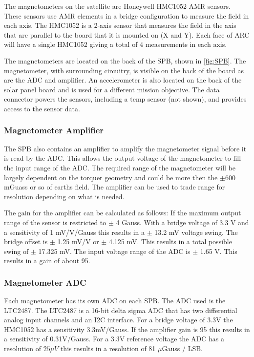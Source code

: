 The magnetometers on the satellite are Honeywell HMC1052 \ac{AMR} sensors. These sensors use \ac{AMR} elements in a bridge configuration to measure the field in each axis. The HMC1052 is a 2-axis sensor that measures the field in the axis that are parallel to the board that it is mounted on (X and Y). Each face of \ac{ARC} will have a single HMC1052 giving a total of 4 measurements in each axis.

The magnetometers are located on the back of the \acs{SPB}, shown in \cref{fig:SPB}. The magnetometer, with surrounding circuitry, is visible on the back of the board as are the ADC and amplifier. An accelerometer is also located on the back of the solar panel board and is used for a different mission objective. The data connector powers the sensors, including a temp sensor (not shown), and provides access to the sensor data.

\subsubsection{Magnetometer Amplifier}


The \ac{SPB} also contains an amplifier to amplify the magnetometer signal before it is read by the \ac{ADC}. This allows the output voltage of the magnetometer to fill the input range of the \ac{ADC}. The required range of the magnetometer will be largely dependent on the torquer geometry and could be more then the $\pm$600 mGuass or so of earths field. The amplifier can be used to trade range for resolution depending on what is needed.

The gain for the amplifier can be calculated as follows: If the maximum output range of the sensor is restricted to $\pm$ 4 Gauss. With a bridge voltage of 3.3 V and a sensitivity of 1 mV/V/Gauss this results in a $\pm$ 13.2 mV voltage swing. The bridge offset is $\pm$ 1.25 mV/V or $\pm$ 4.125 mV. This results in a total possible swing of $\pm$ 17.325 mV. The input voltage range of the \ac{ADC} is $\pm$ 1.65 V. This results in a gain of about 95. 

\subsubsection{Magnetometer \acl{ADC}}

Each magnetometer has its own \ac{ADC} on each \ac{SPB}. The \ac{ADC} used is the LTC2487. The LTC2487 is a 16-bit delta sigma \ac{ADC} that has two differential analog input channels and an \ac{I2C} interface. For a bridge voltage of 3.3V the HMC1052 has a sensitivity 3.3mV/Gauss. If the amplifier gain is 95 this results in a sensitivity of 0.31V/Gauss. For a 3.3V reference voltage the \ac{ADC} has a resolution of $25 \mu V$ this results in a resolution of 81 $\mu$Gauss / LSB.

